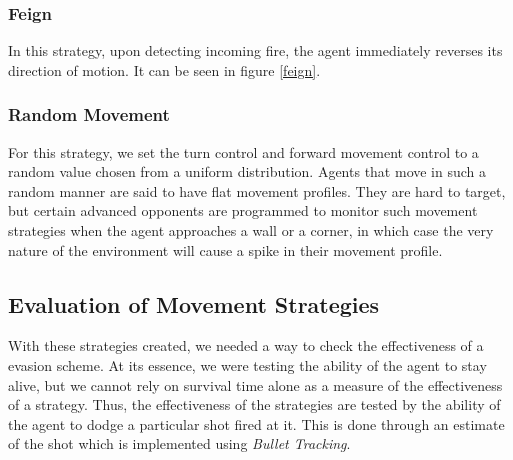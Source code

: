\documentclass{article}
\theoremstyle{plain}
\theoremstyle{definition}
\theoremstyle{remark}
\begin{document}
\subsubsection*{Feign}
In this strategy, upon detecting incoming fire, the agent immediately reverses its direction of motion. It can be seen in figure \ref{feign}.




\subsubsection*{Random Movement}
For this strategy, we set the turn control and forward movement control to a random value chosen from a uniform distribution. Agents that move in such a random manner are said to have flat movement profiles. They are hard to target, but certain advanced opponents are programmed to monitor such movement strategies when the agent approaches a wall or a corner, in which case the very nature of the environment will cause a spike in their movement profile.

\subsection*{Evaluation of Movement Strategies}
With these strategies created, we needed a way to check the effectiveness of a evasion scheme. At its essence, we were testing the ability of the agent to stay alive, but we cannot rely on survival time alone as a measure of the effectiveness of a strategy. Thus, the effectiveness of the strategies are tested by the ability of the agent to dodge a particular shot fired at it. This is done through an estimate of the shot which is implemented using \emph{Bullet Tracking}.
\end{document}

